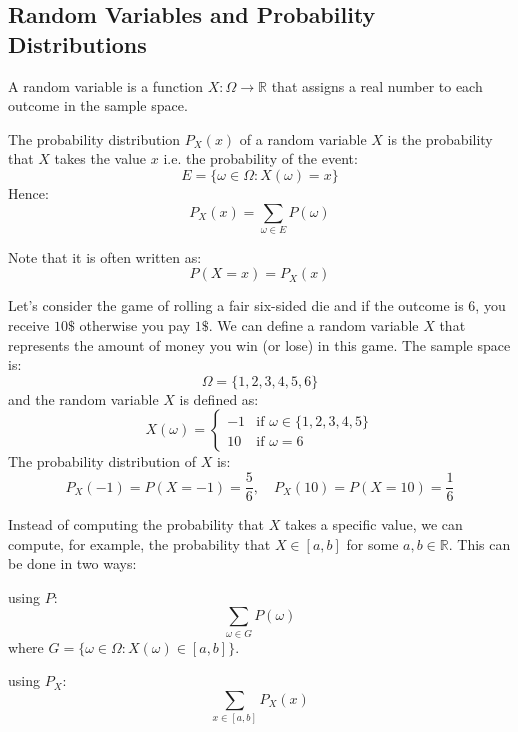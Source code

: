 \subsection{Random Variables and Probability Distributions}
\begin{definition}
    A random variable is a function $X: \Omega \to \mathbb{R}$ that assigns a real number to each outcome in the sample space.
\end{definition}

\begin{definition}
    The probability distribution $P_X(x)$ of a random variable $X$ is the probability that $X$ takes the value $x$ i.e. the probability of the event:
    \[
        E = \{\omega \in \Omega : X(\omega) = x\}
    \]
    Hence:
    \[
        P_X(x) = \sum_{\omega \in E} P(\omega)
    \]
\end{definition}
Note that it is often written as:
\[
    P(X = x) = P_X(x)
\]

\begin{eg}
    Let's consider the game of rolling a fair six-sided die and if the outcome is $6$, you receive $10\$$ otherwise you pay $1\$$. We can define a random variable $X$ that represents the amount of money you win (or lose) in this game. The sample space is:
    \[
        \Omega = \{1, 2, 3, 4, 5, 6\}
    \]
    and the random variable $X$ is defined as:
    \[
        X(\omega) = \begin{cases}
            -1 & \text{if } \omega \in \{1, 2, 3, 4, 5\} \\
            10 & \text{if } \omega = 6
        \end{cases}
    \]
    The probability distribution of $X$ is:
    \[
        P_X(-1) = P(X = -1) = \frac{5}{6}, \quad P_X(10) = P(X = 10) = \frac{1}{6}
    \]
\end{eg}
Instead of computing the probability that $X$ takes a specific value, we can compute, for example, the probability that $X \in [a,b]$ for some $a,b \in \mathbb{R}$. This can be done in two ways:
\begin{citemize}
    \item using $P$:
    \[
        \sum_{\omega \in G} P(\omega)
    \]
    where $G = \{\omega \in \Omega : X(\omega) \in [a,b]\}$.
    \item using $P_X$:
    \[
        \sum_{x \in [a,b]} P_X(x)
    \]
\end{citemize}

